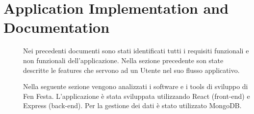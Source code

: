 \documentclass{article}
\begin{document}
\section{Application Implementation and Documentation}
\begin{description}
    \item[] Nei precedenti documenti sono stati identificati tutti i requisiti funzionali e non funzionali
        dell'applicazione. Nella sezione precedente son state descritte le features che servono ad un Utente nel
        suo flusso applicativo.
    \item[] Nella seguente sezione vengono analizzati i software e i tools di sviluppo di Fen Festa. L'applicazione è
        stata sviluppata utilizzando React (front-end) e Express (back-end). Per la gestione dei dati è stato utilizzato MongoDB.
\end{description}
\end{document}
